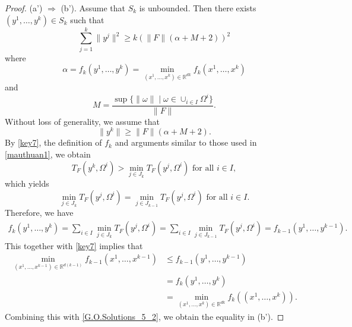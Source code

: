 \documentclass[sn-mathphys-num]{sn-jnl}%
\theoremstyle{definition}
\begin{document}
\begin{proof}
	(a') $\Rightarrow$ (b'). Assume that \(S_k\) is unbounded. Then there exists \((y^1,\dots,y^k)\in S_k\) such that
	\[
	\sum_{j=1}^k \|y^j\|^2 \geq k(\|F\|(\alpha+M+2))^2
	\]
	where 
	\begin{equation}\label{key7}
		\alpha = f_k\left(y^1,\dots,y^k\right) = \min_{(x^1,\dots,x^k)\in \mathbb{R}^{dk}} f_k\left(x^1,\dots,x^k\right)    
	\end{equation}
	and
	\begin{equation*}\label{key77}
		M = \frac{\sup\{\|\omega\| \mid \omega \in \cup_{i\in I}\Omega^i\}}{\|F\|}.
	\end{equation*}
	Without loss of generality, we assume that
	\begin{equation}\label{key6}
		\|y^k\| \geq \|F\|(\alpha+M+2).    
	\end{equation}
	By \eqref{key7}, the definition of $f_k$ and arguments similar to those used in \eqref{mauthuan1}, we obtain
	\[T_F(y^k,\Omega^i)> \min_{j \in J_k}T_F(y^j,\Omega^i) \text{ for all } i \in I,
	\]
	which yields
	\begin{equation*}\label{G.O.Solutions_5_4}
		\min_{j \in J_k} T_F(y^j,\Omega^i)
		= \min_{j \in J_{k-1}} T_F(y^j,\Omega^i) \text{ for all } i \in I. 
	\end{equation*}
	Therefore, we have
	\begin{equation*} \label{G.O.Solutions_5_5}
		\begin{aligned}
			f_k\left(y^1,\dots,y^k\right)=\sum_{i \in I}\min_{j \in J_k}T_F(y^j,\Omega^i) 
			= \sum_{i \in I}\min_{j \in J_{k-1}}T_F(y^j,\Omega^i)=f_{k-1}\left(y^1,\dots,y^{k-1}\right).
		\end{aligned}
	\end{equation*}
	This together with \eqref{key7} implies that
	$$	\begin{aligned}
			\min_{(x^1,\dots,x^{k-1})\in\mathbb{R}^{d(k-1)}}f_{k-1}\left(x^1,\dots,x^{k-1} \right)&\leq f_{k-1}\left(y^1,\dots,y^{k-1}\right)\\
			&=f_k\left(y^1,\dots,y^k\right)\\
			&=\min_{(x^1,\dots,x^k)\in\mathbb{R}^{dk}}f_k\left((x^1,\dots,x^k) \right).
		\end{aligned}$$
	Combining this with \eqref{G.O.Solutions_5_2}, we obtain the equality in (b').


\end{proof}
\end{document}
